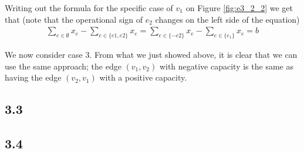 \documentclass[12pt]{article}
\begin{document}
Writing out the formula for the specific case of $v_1$ on Figure \ref{fig:e3_2_2} we get that (note that the operational sign of $e_2$ changes on the left side of the equation)
\begin{align*}
    \sum_{e\in \emptyset}{x_e} - \sum_{e\in \{e1, e2\}}{x_e} =
    \sum_{e\in \{-e2\}}{x_e} - \sum_{e\in \{e_1\}}{x_e} = b
\end{align*}

We now consider case 3. From what we just showed above, it is clear that we can use the same approach; the edge $(v_1, v_2)$ with negative capacity is the same as having the edge $(v_2, v_1)$ with a positive capacity.

\subsection{3.3}
\subsection{3.4}
\end{document}
